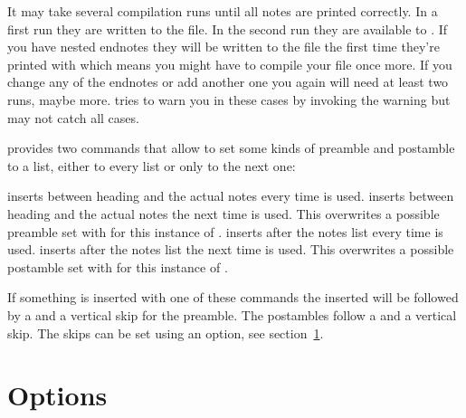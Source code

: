 \documentclass[toc=bib,toc=index]{cnpkgdoc}
\makeatletter
\providecommand*\sinceversion[1]{%
  \@bsphack
  \marginnote{%
    \footnotesize\sffamily\RaggedRight
    \textcolor{black!75}{Introduced in version~#1}}%
  \@esphack}
\makeatother
\begin{document}
It may take several compilation runs until all notes are printed correctly. In
a first run they are written to the  file. In the second run they are
available to . If you have nested endnotes they will be written
to the  file the first time they're printed with 
which means you might have to compile your file once more. If you change any of
the endnotes or add another one you again will need at least two runs, maybe more.
\enotez tries to warn you in these cases by invoking the warning
but may not catch all cases.

\enotez provides two commands that allow to set some kinds of preamble and
postamble to a list, either to every list or only to the next one:
\begin{beschreibung}
 \newline\sinceversion{0.5}%
   inserts  between heading and the actual notes every time
    is used.
 \newline\sinceversion{0.5}%
   inserts  between heading and the actual notes the next time
    is used. This overwrites a possible preamble set with
    for this instance of .
 \newline\sinceversion{0.5}%
   inserts  after the notes list every time  is
   used.
 \newline\sinceversion{0.5}%
   inserts  after the notes list the next time 
   is used. This overwrites a possible postamble set with
    for this instance of .
\end{beschreibung}
If something is inserted with one of these commands the inserted 
will be followed by a  and a vertical skip for the preamble. The postambles
follow a  and a vertical skip. The skips can be set using an option,
see section~\ref{sec:options}.


\section{Options}\label{sec:options}
\end{document}
